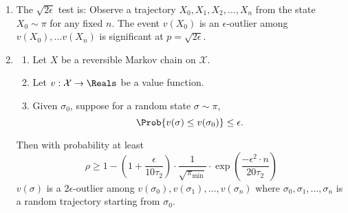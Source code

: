 \documentclass[12pt]{article}
\begin{document}
\begin{enumerate}
    \item
        The \( \sqrt{2\epsilon} \) test is:  Observe a trajectory \( X_0,
        X_1, X_2, \dots, X_n \) from the state  \( X_0 \sim \pi \) for any fixed \(
        n \).  The event \( v(X_0) \) is an \( \epsilon \)-outlier among
        \( v(X_0), \dots v(X_n ) \) is significant at \( p = \sqrt {2\epsilon}
        \).
    \item \begin{theorem}
    \label{thm:significance:powerthm}
    \begin{enumerate}
        \item
            Let \( X \) be a reversible Markov chain on \( \mathcal{X} \).
        \item
            Let \( v :  \mathcal{X} \to \Reals \) be a value function.
        \item
            Given \( \sigma_0 \), suppose for a random state \( \sigma
            \sim \pi \),
            \[
                \Prob{v(\sigma) \le v(\sigma_0)} \le \epsilon.
            \]
    \end{enumerate}
    Then with probability at least
    \[
        \rho \ge 1 - \left( 1 + \frac{\epsilon}{10 \tau_2} \right) \cdot
        \frac{1}{\sqrt{\pi_{\min}}} \cdot \exp \left( \frac {-\epsilon^
        {2} \cdot n}{20 \tau_{2}} \right)
    \] \( v(\sigma) \) is a \( 2\epsilon \)-outlier among \( v(\sigma_0),
    v(\sigma_1), \dots, v(\sigma_n) \) where \( \sigma_0, \sigma_1,
    \dots, \sigma_n \) is a random trajectory starting from \( \sigma_0 \).
\end{theorem}
\end{enumerate}

\hr

\end{document}

